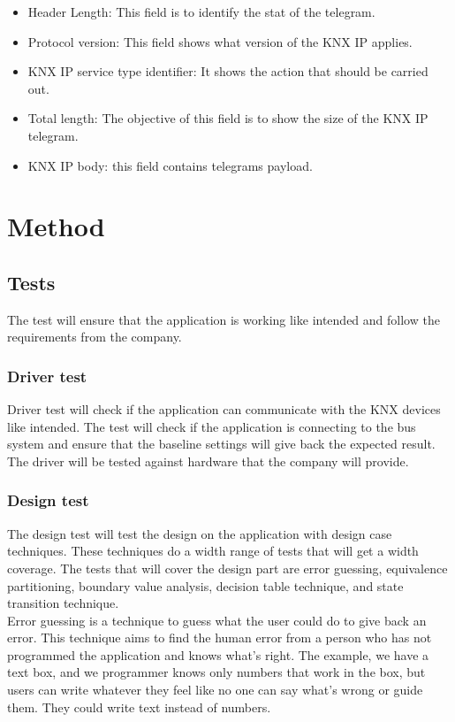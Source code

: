 \documentclass{article}
\begin{document}
\begin{enumerate}
    \begin{itemize}
        \item Header Length: This field is to identify the stat of the telegram. 
        \item Protocol version: This field shows what version of the KNX IP applies. 
        \item KNX IP service type identifier: It shows the action that should be carried out.
        \item Total length: The objective of this field is to show the size of the KNX IP telegram.
        \item KNX IP body: this field contains telegrams payload. \cite{KNXBasic}
    \end{itemize}
\end{enumerate}
\section{Method}
\subsection{Tests}
The test will ensure that the application is working like intended and follow the requirements from the company. 
\subsubsection{Driver test}
Driver test will check if the application can communicate with the KNX devices like intended.  The test will check if the application is connecting to the bus system and ensure that the baseline settings will give back the expected result. The driver will be tested against hardware that the company will provide. 
\subsubsection{Design test}
The design test will test the design on the application with design case techniques. These techniques do a width 
range of tests that will get a width coverage. The tests that will cover the design part are error 
guessing, equivalence partitioning, boundary value analysis, decision table technique, and state transition technique.\\

Error guessing is a technique to guess what the user could do to give back an error. This technique aims to find the human error from a person who has not programmed the application and knows what's right. The example, we have a text box, and we programmer knows only numbers that work in the box, but users can write whatever they feel like no one can say what's wrong or guide them. They could write text instead of numbers.\\
\end{document}

